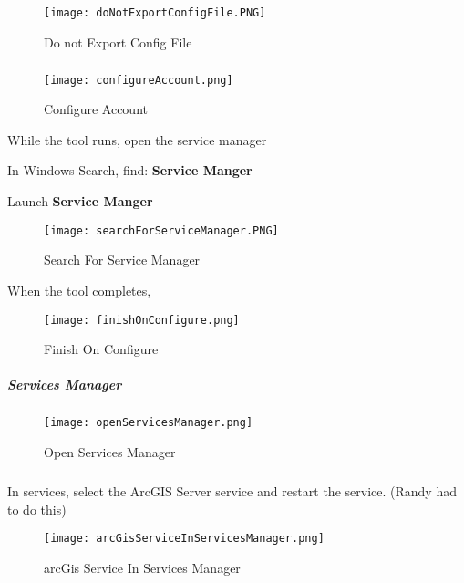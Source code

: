 \begin{figure}[h!]
\centering
\texttt{[image: doNotExportConfigFile.PNG]}
\caption{Do not Export Config File}
\end{figure}
\subparagraph*{}
\begin{figure}[h!]
\centering
\texttt{[image: configureAccount.png]}
\caption{Configure Account}
\end{figure}
\clearpage
\noindent While the tool runs, open the service manager
\vspace{.2in}

\noindent In Windows Search, find: \textbf{Service Manger}
\vspace{.2in}

\noindent Launch \textbf{Service Manger}
\begin{figure}[h!]
\centering
\texttt{[image: searchForServiceManager.PNG]}
\caption{Search For Service Manager}
\end{figure}
\vspace{.2in}
\noindent When the tool completes,\\
\begin{figure}[h!]
\centering
\texttt{[image: finishOnConfigure.png]}
\caption{Finish On Configure}
\end{figure}
\clearpage
\subparagraph*{Services Manager}
\begin{figure}[h!]
\centering
\texttt{[image: openServicesManager.png]}
\caption{Open Services Manager}
\end{figure}
\subparagraph*{}
\noindent In services, select the ArcGIS Server service and restart the service.  (Randy had to do this)\\

\begin{figure}[h!]
\centering
\texttt{[image: arcGisServiceInServicesManager.png]}
\caption{arcGis Service In Services Manager}
\end{figure}


\clearpage


